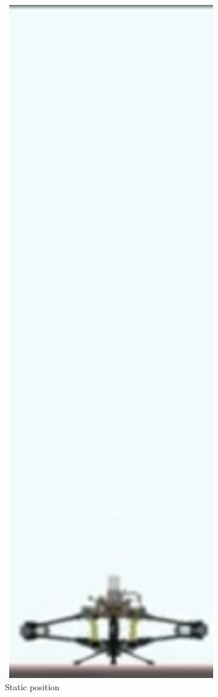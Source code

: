 \begin{figure}[H]
\begin{minipage}[b]{0.15\textwidth}
        \caption*{Static position}
    \end{minipage}
    \hspace{0.02\textwidth}
    \begin{minipage}[b]{0.15\textwidth}
        \centering
        \includegraphics[width=0.82\textwidth]{daedalus-jumper-2.png}

\end{minipage}
\end{figure}
